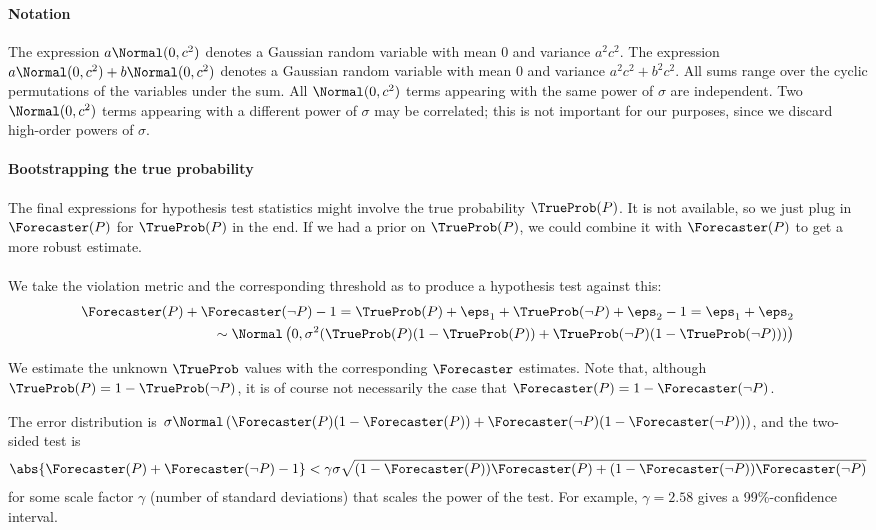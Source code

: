 \paragraph{Notation}
The expression $a \Normal(0, c^2)$ denotes a Gaussian random variable with mean 0 and variance $a^2 c^2$.
The expression $a \Normal(0, c^2) + b \Normal(0, c^2)$ denotes a Gaussian random variable with mean 0 and variance $a^2 c^2 + b^2 c^2$.
All sums range over the cyclic permutations of the variables under the sum.
All $\Normal(0, c^2)$ terms appearing with the same power of $\sigma$ are independent.
Two $\Normal(0, c^2)$ terms appearing with a different power of $\sigma$ may be correlated; this is not important for our purposes, since we discard high-order powers of $\sigma$.

\paragraph{Bootstrapping the true probability}
The final expressions for hypothesis test statistics might involve the true probability $\TrueProb(P)$.
It is not available, so we just plug in $\Forecaster(P)$ for $\TrueProb(P)$ in the end.
If we had a prior on $\TrueProb(P)$, we could combine it with $\Forecaster(P)$ to get a more robust estimate.


\paragraph{\NegChecker}
We take the violation metric and the corresponding threshold as to produce a hypothesis test against this:
\begin{align*}
   \Forecaster(P) + \Forecaster(\neg P) - 1
   = \TrueProb(P) + \eps_1 + \TrueProb(\neg P) + \eps_2 - 1
   = \eps_1 + \eps_2
   \\
   \sim \Normal\left(0, \sigma^2 (\TrueProb(P)(1 - \TrueProb(P)) + \TrueProb(\neg P)(1 - \TrueProb(\neg P))) \right)
\end{align*}


We estimate the unknown $\TrueProb$ values with the corresponding $\Forecaster$ estimates.  Note that, although $\TrueProb(P) = 1- \TrueProb(\neg P)$, it is of course not necessarily the case that $\Forecaster(P) = 1- \Forecaster(\neg P)$.

The error distribution is $\sigma \Normal\left( \Forecaster(P) (1 - \Forecaster(P)) + \Forecaster(\neg P) (1 - \Forecaster(\neg P)) \right)$, and the two-sided test is
\begin{align*}
   \abs{\Forecaster(P) + \Forecaster(\neg P) - 1} < \gamma \sigma \sqrt{(1 - \Forecaster(P)) \Forecaster(P) + (1 - \Forecaster(\neg P)) \Forecaster(\neg P)}
\end{align*}
for some scale factor $\gamma$ (number of standard deviations) that scales the power of the test. For example, $\gamma = 2.58$ gives a 99\%-confidence interval.

